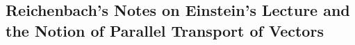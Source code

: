 


\subsection{Reichenbach's Notes on Einstein's Lecture and the Notion of Parallel Transport of Vectors}




